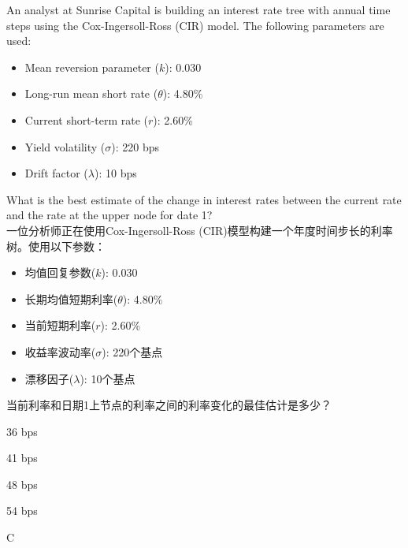 \documentclass{article}
\newcounter{question} %
\begin{document}
\begin{question}
    An analyst at Sunrise Capital is building an interest rate tree with annual time steps using the Cox-Ingersoll-Ross (CIR) model. The following parameters are used:
    \begin{itemize}
        \item Mean reversion parameter (\(k\)): 0.030
        \item Long-run mean short rate (\(\theta\)): 4.80\%
        \item Current short-term rate (\(r\)): 2.60\%
        \item Yield volatility (\(\sigma\)): 220 bps
        \item Drift factor (\(\lambda\)): 10 bps
    \end{itemize}
    What is the best estimate of the change in interest rates between the current rate and the rate at the upper node for date 1?
    \\一位分析师正在使用Cox-Ingersoll-Ross (CIR)模型构建一个年度时间步长的利率树。使用以下参数：
    \begin{itemize}
        \item 均值回复参数(\(k\)): 0.030
        \item 长期均值短期利率(\(\theta\)): 4.80\%
        \item 当前短期利率(\(r\)): 2.60\%
        \item 收益率波动率(\(\sigma\)): 220个基点
        \item 漂移因子(\(\lambda\)): 10个基点
    \end{itemize}
    当前利率和日期1上节点的利率之间的利率变化的最佳估计是多少？
\end{question}

\begin{choices}
    \item 36 bps
    \item 41 bps
    \item 48 bps
    \item 54 bps
\end{choices}

\begin{correctanswer}
    C
\end{correctanswer}
\end{document}
